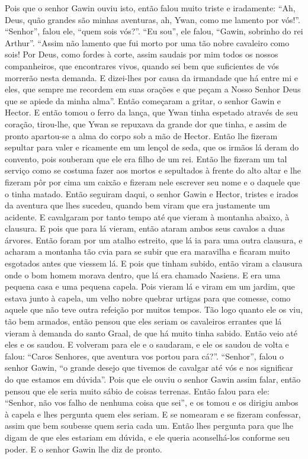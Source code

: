 Pois que o senhor Gawin ouviu isto, então falou muito triste e iradamente: “Ah,
Deus, quão grandes são minhas aventuras, ah, Ywan, como me lamento por vós!”.
“Senhor”, falou ele, “quem sois vós?”. “Eu sou”, ele falou, “Gawin, sobrinho do
rei Arthur”. “Assim não lamento que fui morto por uma tão nobre cavaleiro como
sois! Por Deus, como fordes à corte, assim saudais por mim todos os nossos
companheiros, que encontrares vivos, quando sei bem que suficientes de vós
morrerão nesta demanda. E dizei-lhes por causa da irmandade que há entre mi e
eles, que sempre me recordem em suas orações e que peçam a Nosso Senhor Deus
que se apiede da minha alma”. Então começaram a gritar, o senhor Gawin e
Hector. E então tomou o ferro da lança, que Ywan tinha espetado através de seu
coração, tirou-lhe, que Ywan se repuxava da grande dor que tinha, e assim de
pronto apartou-se a alma do corpo sob a mão de Hector. Então lhe fizeram
sepultar para valer e ricamente em um lençol de seda, que os irmãos lá deram do
convento, pois souberam que ele era filho de um rei. Então lhe fizeram
um tal serviço como se costuma fazer aos mortos e sepultados à frente do alto
altar e lhe fizeram pôr por cima um caixão e fizeram nele escrever seu nome e o
daquele que o tinha matado. Então seguiram daqui, o senhor Gawin e Hector,
tristes e irados da aventura que lhes sucedeu, quando bem viram que era
justamente um acidente. E cavalgaram por tanto tempo até que vieram à montanha
abaixo, à clausura. E pois que para lá vieram, então ataram ambos seus cavalos
a duas árvores. Então foram por um atalho estreito, que lá ia para uma outra
clausura, e acharam a montanha tão cvia para se subir que era maravilha e
ficaram muito esgotados antes que viessem lá. E pois que tinham subido, então
viram a clausura onde o bom homem morava dentro, que lá era chamado Nasiens. E
era uma pequena casa e uma pequena capela. Pois vieram lá e viram em um jardim,
que estava junto à capela, um velho nobre quebrar urtigas para que comesse,
como aquele que não teve outra refeição por muitos tempos. Tão logo quanto ele
os viu, tão bem armados, então pensou que eles seriam os cavaleiros errantes
que lá vieram à demanda do santo Graal, de que há muito tinha sabido. Então
veio até eles e os saudou. E volveram para ele e o saudaram, e ele os saudou de
volta e falou: “Caros Senhores, que aventura vos portou para cá?”. “Senhor”,
falou o senhor Gawin, “o grande desejo que tivemos de cavalgar até vós e nos
significar do que estamos em dúvida”. Pois que ele ouviu o senhor Gawin assim
falar, então pensou que ele seria muito sábio de coisas terrenas. Então falou
para ele: “Senhor, não vos falho de nenhuma coisa que sei”, e os tomou e os
dirigiu ambos à capela e lhes pergunta quem eles seriam. E se nomearam e se
fizeram confessar, assim que bem soubesse quem seria cada um. Então lhes
pergunta para que lhe digam de que eles estariam em dúvida, e ele queria
aconselhá-los conforme seu poder. E o senhor Gawin lhe diz de pronto.

